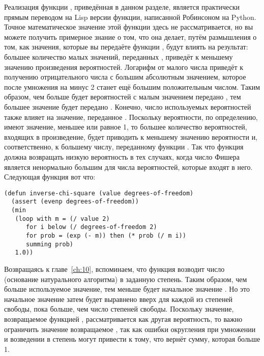 Реализация функции , приведённая в данном разделе, является
практически прямым переводом на Lisp версии функции, написанной Робинсоном на Python.
Точное математическое значение этой функции здесь не рассматривается, но вы можете
получить примерное знание о том, что она делает, путём размышления о том, как значения,
которые вы передаёте функции , будут влиять на результат: большее количество
малых значений, переданных , приведёт к меньшему значению произведения
вероятностей.  Логарифм от малого числа приведёт к получению отрицательного числа с
большим абсолютным значением, которое после умножения на минус 2 станет ещё большим
положительным числом.  Таким образом, чем больше будет вероятностей с малым значением
передано , тем большее значение будет передано
. Конечно, число используемых вероятностей также влияет на
значение, переданное .  Поскольку вероятности, по определению,
имеют значение, меньшее или равное 1, то большее количество вероятностей, входящих в
произведение, будет приводить к меньшему значению вероятности и, соответственно, к
большему числу, переданному функции .  Так что функция
 должна возвращать низкую вероятность в тех случаях, когда число
Фишера является ненормально большим для числа вероятностей, которые входят в него.
Следующая функция вот что:

\begin{lstlisting}
(defun inverse-chi-square (value degrees-of-freedom)
  (assert (evenp degrees-of-freedom))
  (min 
   (loop with m = (/ value 2)
      for i below (/ degrees-of-freedom 2)
      for prob = (exp (- m)) then (* prob (/ m i))
      summing prob)
   1.0))
\end{lstlisting}

Возвращаясь к главе~\ref{ch:10}, вспоминаем, что функция  возводит число
 (основание натурального алгоритма) в заданную степень.  Таким образом, чем больше
используемое значение, тем меньше будет начальное значение .  Но это начальное
значение затем будет выравнено вверх для каждой из степеней свободы, пока  больше,
чем число степеней свободы.  Поскольку значение, возвращаемое функцией
, рассматривается как другая вероятность, то важно ограничить
значение возвращаемое , так как ошибки округления при умножении и возведении в
степень могут привести к тому, что  вернёт сумму, которая больше 1.


